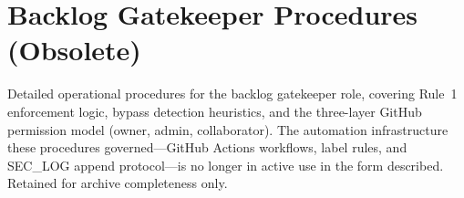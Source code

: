 
\section*{Backlog Gatekeeper Procedures (Obsolete)}

Detailed operational procedures for the backlog gatekeeper role, covering
Rule~1 enforcement logic, bypass detection heuristics, and the three-layer
GitHub permission model (owner, admin, collaborator). The automation
infrastructure these procedures governed---GitHub Actions workflows, label
rules, and SEC\_LOG append protocol---is no longer in active use in the form
described. Retained for archive completeness only.
